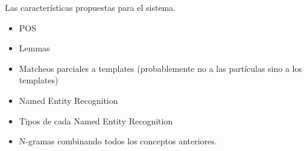 Las características propuestas para el sistema.
\begin{itemize}
    \item POS
    \item Lemmas
    \item Matcheos parciales a templates (probablemente no a las partículas sino a los templates)
    \item Named Entity Recognition
    \item Tipos de cada Named Entity Recognition
    \item N-gramas combinando todos los conceptos anteriores.

\end{itemize}
